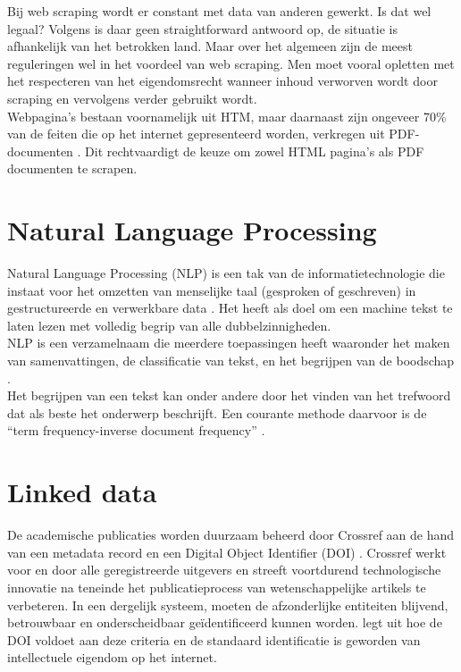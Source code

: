 Bij web scraping wordt er constant met data van anderen gewerkt. Is dat wel legaal? Volgens \textcite{EPSI2015} is daar geen straightforward antwoord op, de situatie is afhankelijk van het betrokken land. Maar over het algemeen zijn de meest reguleringen wel in het voordeel van web scraping. Men moet vooral opletten met het respecteren van het eigendomsrecht wanneer inhoud verworven wordt door scraping en vervolgens verder gebruikt wordt.\\
Webpagina's bestaan voornamelijk uit HTM, maar daarnaast zijn ongeveer 70\% van de feiten die op het internet gepresenteerd worden, verkregen uit PDF-documenten \autocite{Singrodia2019}. Dit rechtvaardigt de keuze om zowel HTML pagina's als PDF documenten te scrapen.\\
\section{Natural Language Processing}
Natural Language Processing (NLP) is een tak van de informatietechnologie die instaat voor het omzetten van menselijke taal (gesproken of geschreven) in gestructureerde en verwerkbare data \autocite{Fanni2023}.
Het heeft als doel om een machine tekst te laten lezen met volledig begrip van alle dubbelzinnigheden.\\
NLP is een verzamelnaam die meerdere toepassingen heeft waaronder het maken van samenvattingen, de classificatie van tekst, en het begrijpen van de boodschap \autocite{Khurana2022}.\\
Het begrijpen van een tekst kan onder andere door het vinden van het trefwoord dat als beste het onderwerp beschrijft. Een courante methode daarvoor is de ``term frequency-inverse document frequency'' \autocite{Havrlant2017}.
\section{Linked data}
De academische publicaties worden duurzaam beheerd door Crossref aan de hand van een metadata record en een Digital Object Identifier (DOI) \autocite{Hendricks2020}. Crossref werkt voor en door alle geregistreerde uitgevers en streeft voortdurend technologische innovatie na teneinde het publicatieprocess van wetenschappelijke artikels te verbeteren.
In een dergelijk systeem, moeten de afzonderlijke entiteiten blijvend, betrouwbaar en onderscheidbaar geïdentificeerd kunnen worden. \textcite{Chandrakar2006} legt uit hoe de DOI voldoet aan deze criteria en de standaard identificatie is geworden van intellectuele eigendom op het internet.
